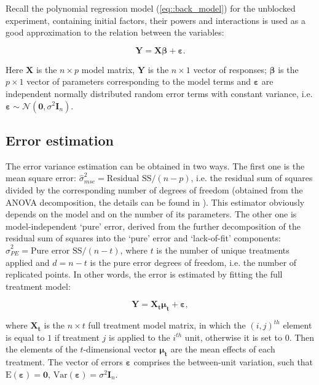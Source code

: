 \documentclass[11pt]{article}
\begin{document}
Recall the polynomial regression model (\ref{eq::back_model}) for the unblocked experiment, containing initial factors, their powers and interactions is used as a good approximation to the relation between the variables:  

\begin{equation}
\label{eq::back_model}
\bm{Y}=\bm{X\beta}+\bm{\varepsilon}.
\end{equation} 

Here $\bm{X}$ is the $n\times p$ model matrix, $\bm{Y}$ is the $n\times 1$ vector of responses; $\bm{\beta}$ is the $p\times 1$ vector of parameters corresponding to the model terms and $\bm{\varepsilon}$ are independent normally distributed random error terms with constant variance, i.e. $\bm{\varepsilon}\sim \mathcal{N}(\bm{0},\sigma^{2}\bm{I}_{n})$.

\subsection{Error estimation}
The error variance estimation can be obtained in two ways. The first one is the mean square error: $\hat{\sigma}^2_{mse}=\mbox{Residual SS}/(n-p)$, i.e. the residual sum of squares divided by the corresponding number of degrees of freedom (obtained from the ANOVA decomposition, the details can be found in \cite{Draper1998}). This estimator obviously depends on the model and on the number of its parameters. The other one is model-independent `pure' error, derived from the further decomposition of the residual sum of squares into the `pure' error and `lack-of-fit' components: $\hat{\sigma}^2_{PE}=\mbox{Pure error SS}/(n-t)$, where $t$ is the number of unique treatments applied and $d=n-t$ is the pure error degrees of freedom, i.e. the number of replicated points. In other words, the error is estimated by fitting the full treatment model:

\begin{equation}
\label{eq::back_trnt}
\bm{Y}=\bm{X_{t}\mu_{t}}+\bm{\varepsilon},
\end{equation} 

where $\bm{X_{t}}$ is the $n\times t$ full treatment model matrix, in which the $(i,j)^{th}$ element is equal to $1$ if treatment $j$ is applied to the $i^{th}$ unit, otherwise it is set to $0$. Then the elements of the $t$-dimensional vector $\bm{\mu_{t}}$ are the mean effects of each treatment. The vector of errors $\bm{\varepsilon}$ comprises the between-unit variation, such that $\mbox{E}(\bm{\varepsilon})=\bm{0}$, $\mbox{Var}(\bm{\varepsilon})=\sigma^2\bm{I}_{n}$.
\end{document}
